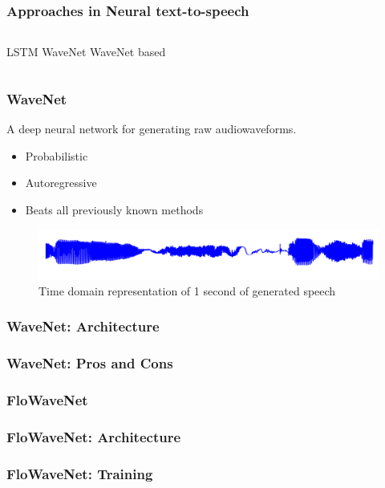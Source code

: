 \documentclass{beamer}
\begin{document}
  \begin{frame}
    \frametitle{Approaches in Neural text-to-speech}
      \begin{columns}
          LSTM
          WaveNet
          WaveNet based
      \end{columns}
  \end{frame}

  \begin{frame}
    \frametitle{WaveNet}
      A deep neural network for generating raw audiowaveforms.

      \begin{itemize}
        \item Probabilistic 
        \item Autoregressive
        \item Beats all previously known methods
      \end{itemize}
      \begin{figure}
        \centering
        \includegraphics[width=\textwidth]{images/second_of_speech.png}
        \caption{Time domain representation of 1 second of generated speech}
      \end{figure}
  \end{frame}

  \begin{frame}
    \frametitle{WaveNet: Architecture}

  \end{frame}

  \begin{frame}
    \frametitle{WaveNet: Pros and Cons}
  \end{frame}

  \begin{frame}
    \frametitle{FloWaveNet}

  \end{frame}

  \begin{frame}
    \frametitle{FloWaveNet: Architecture}
  \end{frame}

  \begin{frame}
    \frametitle{FloWaveNet: Training}
  \end{frame}
\end{document}
